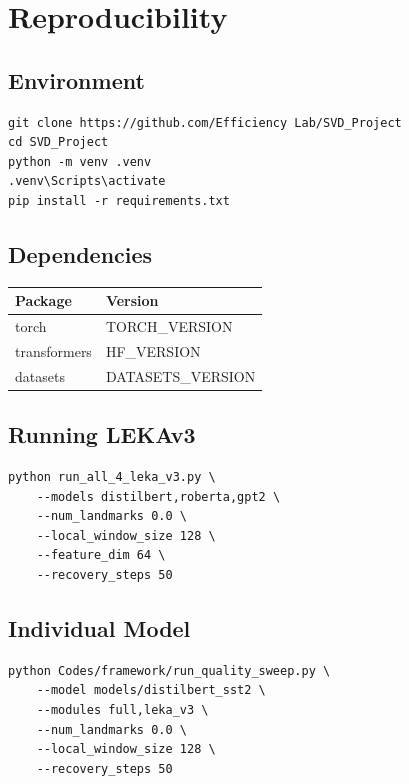 \section{Reproducibility}

\subsection{Environment}

\begin{lstlisting}
git clone https://github.com/Efficiency Lab/SVD_Project
cd SVD_Project
python -m venv .venv
.venv\Scripts\activate
pip install -r requirements.txt
\end{lstlisting}

\subsection{Dependencies}

\begin{table}[H]
\centering
\small
\begin{tabular}{ll}
\toprule
\textbf{Package} & \textbf{Version} \\
\midrule
torch & {{TORCH\_VERSION}} \\
transformers & {{HF\_VERSION}} \\
datasets & {{DATASETS\_VERSION}} \\
\bottomrule
\end{tabular}
\end{table}

\subsection{Running LEKAv3}

\begin{lstlisting}
python run_all_4_leka_v3.py \
    --models distilbert,roberta,gpt2 \
    --num_landmarks 0.0 \
    --local_window_size 128 \
    --feature_dim 64 \
    --recovery_steps 50
\end{lstlisting}

\subsection{Individual Model}

\begin{lstlisting}
python Codes/framework/run_quality_sweep.py \
    --model models/distilbert_sst2 \
    --modules full,leka_v3 \
    --num_landmarks 0.0 \
    --local_window_size 128 \
    --recovery_steps 50
\end{lstlisting}

